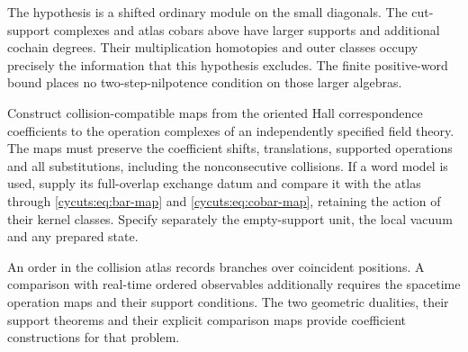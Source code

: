 The hypothesis is a shifted ordinary module on the small diagonals.
The cut-support complexes and atlas cobars above have larger supports
and additional cochain degrees. Their multiplication homotopies and
outer classes occupy precisely the information that this hypothesis
excludes. The finite positive-word bound places no two-step-nilpotence
condition on those larger algebras.

\begin{problem}\label{cycuts:prob:field-comparison}
Construct collision-compatible maps from the oriented Hall
correspondence coefficients to the operation complexes of an
independently specified field theory. The maps must preserve the
coefficient shifts, translations, supported operations and all
substitutions, including the nonconsecutive collisions. If a word
model is used, supply its full-overlap exchange datum and compare
it with the atlas through \eqref{cycuts:eq:bar-map} and
\eqref{cycuts:eq:cobar-map}, retaining the action of their kernel
classes. Specify separately the empty-support unit, the local
vacuum and any prepared state.
\end{problem}

An order in the collision atlas records branches over coincident
positions. A comparison with real-time ordered observables additionally
requires the spacetime operation maps and their support conditions.
The two geometric dualities, their support theorems and their explicit
comparison maps provide coefficient constructions for that problem.

\endgroup
